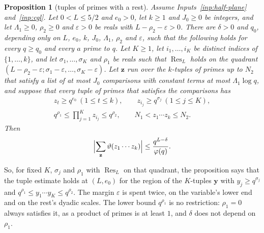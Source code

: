 \documentclass[11pt]{article}
\newtheorem{proposition}[theorem]{Proposition}
\theoremstyle{definition}
\begin{document}
\begin{proposition}[tuples of primes with a rest]\label{prop:tuples-rest}
Assume Inputs~\ref{inp:half-plane} and~\ref{inp:cgl}. Let $0 < L \le 5/2$ and $e_0 > 0$, let $k \ge 1$ and $J_0 \ge 0$
be integers, and
let $\Lambda_1 \ge 0$, $\rho_2 \ge 0$ and $\varepsilon > 0$ be reals with $L - \rho_2 - \varepsilon > 0$. There are
$\delta > 0$ and $q_0$, depending only on $L$, $e_0$, $k$, $J_0$, $\Lambda_1$, $\rho_2$ and $\varepsilon$, such that
the following holds for every $q \ge q_0$ and every $a$ prime to $q$. Let $K \ge 1$, let $i_1, \dots, i_K$ be distinct
indices of $\{1, \dots, k\}$, and let $\sigma_1, \dots, \sigma_K$ and $\rho_1$ be reals
such that $\operatorname{Res}_L$ holds on the quadrant $(L - \rho_2 - \varepsilon; \sigma_1 - \varepsilon, \dots,
\sigma_K - \varepsilon)$. Let $\mathbf z$ run over the $k$-tuples of primes up to $N_2$ that satisfy a list of at most
$J_0$ comparisons with constant terms at most $\Lambda_1 \log q$, and suppose that every tuple of primes that
satisfies the
comparisons has
\begin{gather*}
  z_t \ge q^{e_0} \ (1 \le t \le k), \qquad z_{i_j} \ge q^{\sigma_j} \ (1 \le j \le K), \\
  q^{\rho_1} \le \prod_{j = 1}^K z_{i_j} \le q^{\rho_2}, \qquad N_1 < z_1 \cdots z_k \le N_2.
\end{gather*}
Then
\[
  \Bigl|\sum_{\mathbf z} \vartheta(z_1 \cdots z_k)\Bigr| \le \frac{q^{L - \delta}}{\varphi(q)}.
\]
\end{proposition}

So, for fixed $K$, $\sigma_j$ and $\rho_1$ with $\operatorname{Res}_L$ on that quadrant, the proposition says that the
tuple estimate holds at $(L, e_0)$ for the region of the $K$-tuples $\mathbf y$ with $y_j \ge q^{\sigma_j}$ and
$q^{\rho_1} \le y_1 \cdots y_K \le q^{\rho_2}$. The margin $\varepsilon$ is spent twice, on the variable's lower end and
on the rest's dyadic scales. The lower bound $q^{\rho_1}$ is no restriction: $\rho_1 = 0$ always satisfies it, as a
product of primes is at least $1$, and $\delta$ does not depend on $\rho_1$.
\end{document}
